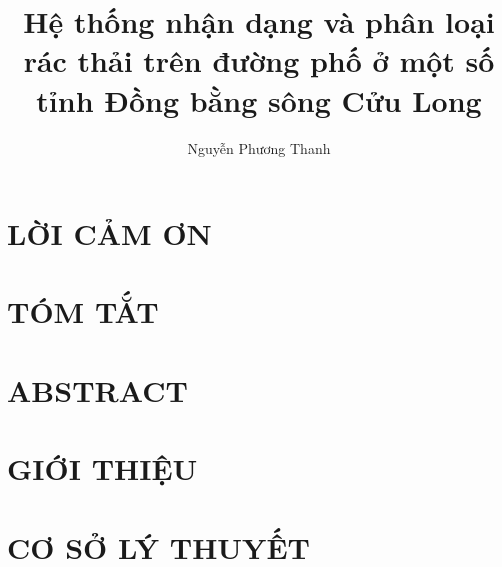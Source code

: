 \documentclass[a4paper,12pt,oneside]{report}
\title{Hệ thống nhận dạng và phân loại rác thải trên đường phố ở một số tỉnh Đồng bằng sông Cửu Long}						%
\author{Nguyễn Phương Thanh}				%
\begin{document}


% 

\chapter*{\centering LỜI CẢM ƠN}


% 

\chapter*{\centering TÓM TẮT}
 

\chapter*{\centering ABSTRACT}
 

% 

\tableofcontents
\listoffigures
\listoftables
\glsaddall

\printglossary[title=DANH MỤC TỪ VIẾT TẮT]


\clearpage
{}			%

\chapter{\centering GIỚI THIỆU}

\chapter{\centering CƠ SỞ LÝ THUYẾT}

\end{document}
